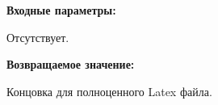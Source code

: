 \textbf{Входные параметры:}

Отсутствует.

\textbf{Возвращаемое значение:}

Концовка для полноценного Latex файла.